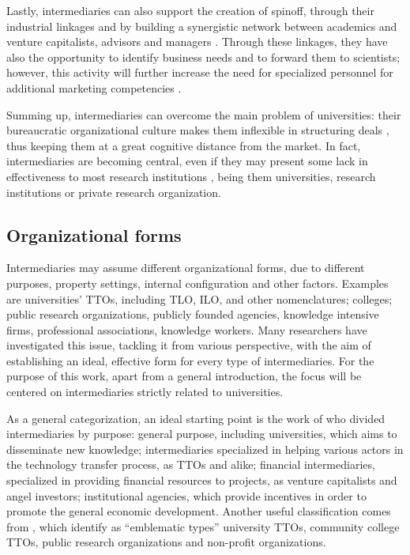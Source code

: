 Lastly, intermediaries can also support the creation of spinoff, through their industrial linkages and by building a synergistic network between academics and venture capitalists, advisors and managers \citep{OShea2004}. Through these linkages, they have also the opportunity to identify business needs and to forward them to scientists; however, this activity will further increase the need for specialized personnel for additional marketing competencies \citep{Geuna2009,Muscio2008}. 

Summing up, intermediaries can overcome the main problem of universities: their bureaucratic organizational culture makes them inflexible in structuring deals \citep{Siegel2003a}, thus keeping them at a great cognitive distance from the market. In fact, intermediaries are becoming central, even if they may present some lack in effectiveness to most research institutions \citep{Geuna2009}, being them universities, research institutions or private research organization.

\subsection{Organizational forms}

Intermediaries may assume different organizational forms, due to different purposes, property settings, internal configuration and other factors. Examples are universities' TTOs, including TLO, ILO, and other nomenclatures; colleges; public research organizations, publicly founded agencies, knowledge intensive firms, professional associations, knowledge workers. Many researchers have investigated this issue, tackling it from various perspective, with the aim of establishing an ideal, effective form for every type of intermediaries. For the purpose of this work, apart from a general introduction, the focus will be centered on intermediaries strictly related to universities.

As a general categorization, an ideal starting point is the work of \citet{Yusuf2008} who divided intermediaries by purpose: general purpose, including universities, which aims to disseminate new knowledge; intermediaries specialized in helping various actors in the technology transfer process, as TTOs and alike; financial intermediaries, specialized in providing financial resources to projects, as venture capitalists and angel investors; institutional agencies, which provide incentives in order to promote the general economic development. Another useful classification comes from \citet{Landry2013}, which identify as \enquote{emblematic types} university TTOs, community college TTOs, public research organizations and non-profit organizations.

